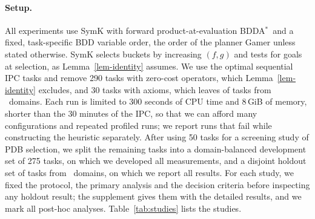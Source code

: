 \documentclass[letterpaper]{article}
\newcommand{\bddastar}{BDDA\ensuremath{^{*}}}
\newcommand{\num}[1]{\numprint{#1}}
\theoremstyle{plain}
\theoremstyle{definition}
\theoremstyle{remark}
\begin{document}
\paragraph{Setup.}
All experiments use SymK \citep{speck-et-al-jair2025} with forward product-at-evaluation \bddastar\ and a fixed, task-specific BDD variable order, the order of the planner Gamer \citep{kissmann-edelkamp-aaai2011} unless stated otherwise.
SymK selects buckets by increasing $(f,g)$ and tests for goals at selection, as Lemma~\ref{lem-identity} assumes.
We use the optimal sequential IPC tasks and remove 290 tasks with zero-cost operators, which Lemma~\ref{lem-identity} excludes, and 30 tasks with axioms, which leaves \num{\CapFullTasks} of \num{1697} tasks from \CapFullDomains\ domains.
Each run is limited to 300 seconds of CPU time and 8\,GiB of memory, shorter than the 30 minutes of the IPC, so that we can afford many configurations and repeated profiled runs; we report runs that fail while constructing the heuristic separately.
After using 50 tasks for a screening study of PDB selection, we split the remaining \num{\CapPrimaryTasks} tasks into a domain-balanced development set of 275 tasks, on which we developed all measurements, and a disjoint holdout set of \num{\HoldoutTasks} tasks from \HoldoutDomains\ domains, on which we report all results.
For each study, we fixed the protocol, the primary analysis and the decision criteria before inspecting any holdout result; the supplement gives them with the detailed results, and we mark all post-hoc analyses.
Table~\ref{tab:studies} lists the studies.
\end{document}
